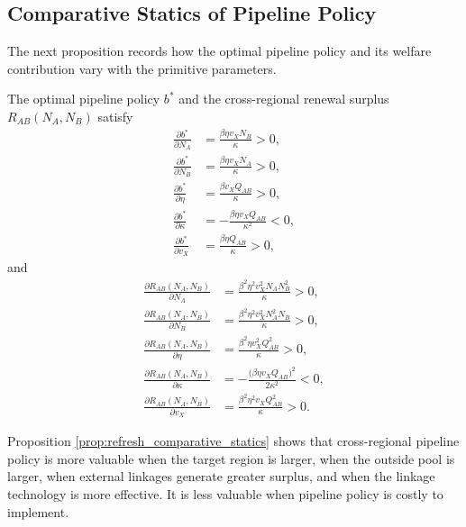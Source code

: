 \subsection{Comparative Statics of Pipeline Policy}

The next proposition records how the optimal pipeline policy and its welfare contribution vary with the primitive parameters.

\begin{proposition}
\label{prop:refresh_comparative_statics}
The optimal pipeline policy $b^*$ and the cross-regional renewal surplus $R_{AB}(N_A,N_B)$ satisfy
\begin{align}
\frac{\partial b^*}{\partial N_A}
&=
\frac{\beta\eta v_X N_B}{\kappa}
>0,
\label{eq:db_dN}
\\[0.4em]
\frac{\partial b^*}{\partial N_B}
&=
\frac{\beta\eta v_X N_A}{\kappa}
>0,
\label{eq:db_dNB}
\\[0.4em]
\frac{\partial b^*}{\partial \eta}
&=
\frac{\beta v_X Q_{AB}}{\kappa}
>0,
\label{eq:db_deta}
\\[0.4em]
\frac{\partial b^*}{\partial \kappa}
&=
-\frac{\beta\eta v_X Q_{AB}}{\kappa^2}
<0,
\label{eq:db_dkappa}
\\[0.4em]
\frac{\partial b^*}{\partial v_X}
&=
\frac{\beta\eta Q_{AB}}{\kappa}
>0,
\label{eq:db_dvX}
\end{align}
and
\begin{align}
\frac{\partial R_{AB}(N_A,N_B)}{\partial N_A}
&=
\frac{\beta^2\eta^2 v_X^2 N_A N_B^2}{\kappa}
>0,
\label{eq:dR_dN}
\\[0.4em]
\frac{\partial R_{AB}(N_A,N_B)}{\partial N_B}
&=
\frac{\beta^2\eta^2 v_X^2 N_A^2 N_B}{\kappa}
>0,
\label{eq:dR_dNB}
\\[0.4em]
\frac{\partial R_{AB}(N_A,N_B)}{\partial \eta}
&=
\frac{\beta^2\eta v_X^2 Q_{AB}^2}{\kappa}
>0,
\label{eq:dR_deta}
\\[0.4em]
\frac{\partial R_{AB}(N_A,N_B)}{\partial \kappa}
&=
-\frac{\bigl(\beta\eta v_X Q_{AB}\bigr)^2}{2\kappa^2}
<0,
\label{eq:dR_dkappa}
\\[0.4em]
\frac{\partial R_{AB}(N_A,N_B)}{\partial v_X}
&=
\frac{\beta^2\eta^2 v_X Q_{AB}^2}{\kappa}
>0.
\label{eq:dR_dvX}
\end{align}
\end{proposition}

Proposition \ref{prop:refresh_comparative_statics} shows that cross-regional pipeline policy is more valuable when the target region is larger, when the outside pool is larger, when external linkages generate greater surplus, and when the linkage technology is more effective. It is less valuable when pipeline policy is costly to implement.

